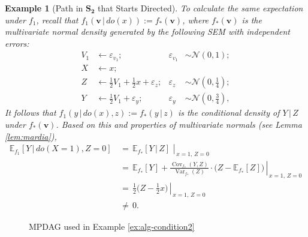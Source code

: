 \documentclass[11pt]{article}
\DeclareMathOperator{\Var}{Var}
\DeclareMathOperator{\Cov}{Cov}
\newtheorem{example}{Example}
\newcommand{\mb}[1]{\mathbf{#1}}
\newcommand{\E}{\mathbb{E}}
\begin{document}
\begin{example}[Path in $\mb{S_2}$ that Starts Directed]
    To calculate the same expectation under $f_1$, recall that $f_1(\mb{v} \,|\, do(x)) := f_*(\mb{v})$, where $f_*(\mb{v})$ is the multivariate normal density generated by the following SEM with independent errors:
    \begin{align}
        V_1       &\gets  \varepsilon_{v_1};                   &\varepsilon_{v_1} &\sim \mathcal{N}(0,1); \label{ex:alg-condition1-sem3}\\
        X   &\gets  x; \nonumber\\
        Z   &\gets  \tfrac{1}{2} V_1 + \tfrac{1}{2} x + \varepsilon_z; &\varepsilon_z &\sim \mathcal{N}(0, \tfrac{1}{4});\nonumber\\
        Y   &\gets  \tfrac{1}{2} V_1 + \varepsilon_y;    &\varepsilon_y &\sim \mathcal{N}(0,\tfrac{3}{4}), \nonumber
    \end{align}
    It follows that $f_1(y \,|\, do(x),z) := f_*(y \,|\, z)$ is the conditional density of $Y \,|\, Z$ under $f_*(\mb{v})$. Based on this and properties of multivariate normals (see Lemma \ref{lem:mardia}),
    \begin{align*}
        \E_{f_1}[Y \,|\, do(X= 1), Z=0]
            &\,=\, \left. \E_{f_*}[Y \,|\, Z] \,\, \right\rvert_{\, x=1, \, Z=0}\\
            &\,=\, \left. \E_{f_*}[Y] + \frac{\Cov_{f_*}(Y,Z)}{\Var_{f_*}(Z)} \cdot \Big(Z - \E_{f_*}[Z]\Big) \, \right\rvert_{\, x=1, \, Z=0}\\
            &\,=\, \left. \tfrac{1}{2} \Big(Z - \frac{1}{2}x \Big) \, \right\rvert_{\, x=1, \, Z=0}\\
            &\,\neq\, 0.
    \end{align*}
\end{example}





\begin{figure}
    \centering
    \begin{subfigure}{.33\textwidth}
        \centering
    \end{subfigure}
    \caption{MPDAG used in Example \ref{ex:alg-condition2}}
    \label{fig:alg-condition2}
\end{figure}
\end{document}

